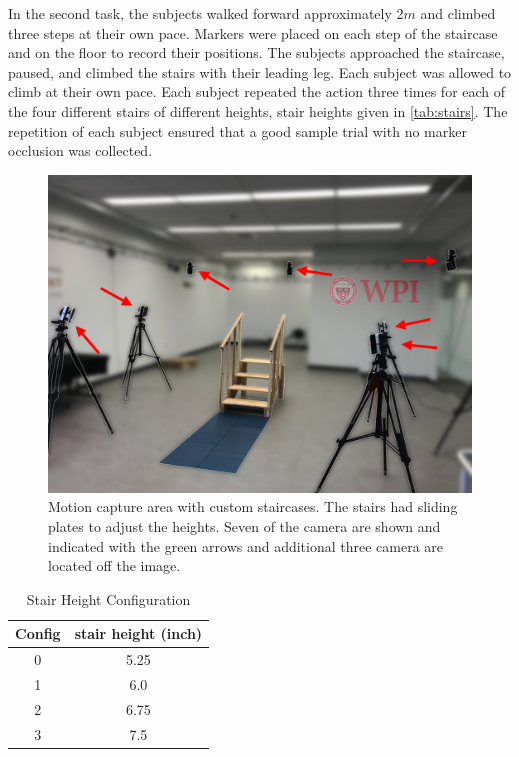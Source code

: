  In the second task, the subjects walked forward approximately 2$m$ and climbed three steps at their own pace. Markers were placed on each step of the staircase and on the floor to record their positions. The subjects approached the staircase, paused, and climbed the stairs with their leading leg. Each subject was allowed to climb at their own pace. Each subject repeated the action three times for each of the four different stairs of different heights, stair heights given in \autoref{tab:stairs}. The repetition of each subject ensured that a good sample trial with no marker occlusion was collected.   
 \begin{figure}[h]
    \centering 
    \includegraphics[scale=0.1,frame]{images/gait_data/stairs_EDIT.jpg}
    \caption[Motion Capture Area]{Motion capture area with custom staircases. The stairs had sliding plates to adjust the heights. Seven of the camera are shown and indicated with the green arrows and additional three camera are located off the image.  }
    \label{fig:mocap} 
\end{figure} 
 
\begin{table}[h!]
\centering
\large
 \begin{tabular}{||c c ||} 
 \hline
 Config & stair height (inch) \\ [0.5ex] 
 \hline\hline
 0 & 5.25  \\ 
 \hline
 1 & 6.0  \\
 \hline
 2 & 6.75  \\
 \hline
 3 & 7.5 \\
 \hline
\end{tabular}
\caption{Stair Height Configuration}
\label{tab:stairs}
\end{table}



